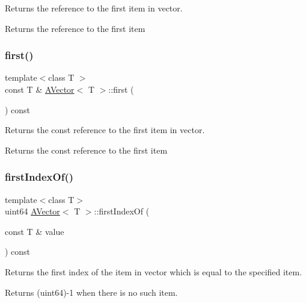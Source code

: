 Returns the reference to the first item in vector. 

\begin{DoxyReturn}{Returns}
the reference to the first item 
\end{DoxyReturn}
\mbox{\label{class_a_vector_a960abfbaf4b7b395286c82d79571147a}} 
\subsubsection{\texorpdfstring{first()}{first()}\hspace{0.1cm}{\footnotesize\ttfamily [2/2]}}
{\footnotesize\ttfamily template$<$class T $>$ \\
const T \& \mbox{\hyperlink{class_a_vector}{A\+Vector}}$<$ T $>$\+::first (\begin{DoxyParamCaption}{ }\end{DoxyParamCaption}) const}



Returns the const reference to the first item in vector. 

\begin{DoxyReturn}{Returns}
the const reference to the first item 
\end{DoxyReturn}
\mbox{\label{class_a_vector_aa8a2735af0f9799c1537d0536ca4f69f}} 
\subsubsection{\texorpdfstring{firstIndexOf()}{firstIndexOf()}}
{\footnotesize\ttfamily template$<$class T$>$ \\
uint64 \mbox{\hyperlink{class_a_vector}{A\+Vector}}$<$ T $>$\+::first\+Index\+Of (\begin{DoxyParamCaption}\item[{const T \&}]{value }\end{DoxyParamCaption}) const}



Returns the first index of the item in vector which is equal to the specified item. 

Returns (uint64)-\/1 when there is no such item.


